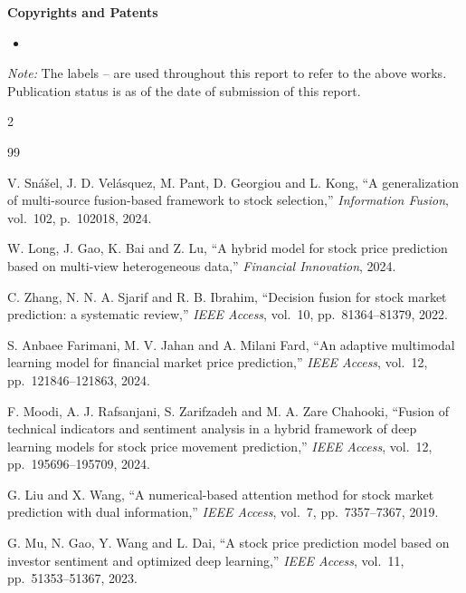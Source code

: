 \ifHasIPR
\textbf{Copyrights and Patents}

\begin{itemize}
\item \IPRentries
\end{itemize}
\fi

\vspace{0.4em}
\textit{Note:} The labels -- are used throughout this report to
refer to the above works. Publication status is as of the date of submission of this
report.

\clearpage
\begin{footnotesize}
\setlength{\parskip}{0pt}
\setlength{\columnsep}{16pt}
\begin{multicols}{2}
\begin{thebibliography}{99}
\setlength{\itemsep}{1.5pt}\setlength{\parsep}{0pt}

 V. Sn\'a\v{s}el, J. D. Vel\'asquez, M. Pant, D. Georgiou and L. Kong,
``A generalization of multi-source fusion-based framework to stock selection,''
\emph{Information Fusion}, vol.~102, p.~102018, 2024.

 W. Long, J. Gao, K. Bai and Z. Lu, ``A hybrid model for stock price
prediction based on multi-view heterogeneous data,'' \emph{Financial Innovation}, 2024.

 C. Zhang, N. N. A. Sjarif and R. B. Ibrahim, ``Decision fusion
for stock market prediction: a systematic review,'' \emph{IEEE Access}, vol.~10,
pp.~81364--81379, 2022.

 S. Anbaee Farimani, M. V. Jahan and A. Milani Fard, ``An adaptive
multimodal learning model for financial market price prediction,'' \emph{IEEE Access},
vol.~12, pp.~121846--121863, 2024.

 F. Moodi, A. J. Rafsanjani, S. Zarifzadeh and M. A. Zare Chahooki,
``Fusion of technical indicators and sentiment analysis in a hybrid framework of deep
learning models for stock price movement prediction,'' \emph{IEEE Access}, vol.~12,
pp.~195696--195709, 2024.

 G. Liu and X. Wang, ``A numerical-based attention method for
stock market prediction with dual information,'' \emph{IEEE Access}, vol.~7,
pp.~7357--7367, 2019.

 G. Mu, N. Gao, Y. Wang and L. Dai, ``A stock price prediction
model based on investor sentiment and optimized deep learning,'' \emph{IEEE Access},
vol.~11, pp.~51353--51367, 2023.


\end{thebibliography}
\end{multicols}
\end{footnotesize}
